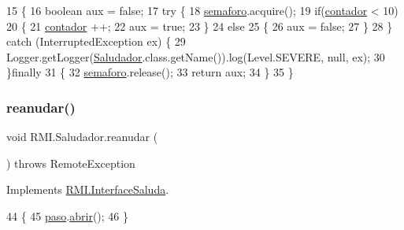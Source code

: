 \begin{DoxyCode}
15     \{
16         \textcolor{keywordtype}{boolean} aux = \textcolor{keyword}{false};
17         \textcolor{keywordflow}{try} \{
18             \mbox{\hyperlink{class_r_m_i_1_1_saludador_a772baa4676a1aa111b792ebd3d77cfcd}{semaforo}}.acquire();
19             \textcolor{keywordflow}{if}(\mbox{\hyperlink{class_r_m_i_1_1_saludador_aee589ef80147254fc33e2b73d5f8ca2b}{contador}} < 10)
20             \{
21                 \mbox{\hyperlink{class_r_m_i_1_1_saludador_aee589ef80147254fc33e2b73d5f8ca2b}{contador}} ++;
22                 aux = \textcolor{keyword}{true};
23             \}
24             \textcolor{keywordflow}{else}
25             \{
26                 aux = \textcolor{keyword}{false};
27             \}
28         \} \textcolor{keywordflow}{catch} (InterruptedException ex) \{
29             Logger.getLogger(\mbox{\hyperlink{class_r_m_i_1_1_saludador_a142d4fff5a3506d069b4a80a9e571de0}{Saludador}}.class.getName()).log(Level.SEVERE, null, ex);
30         \}\textcolor{keywordflow}{finally}
31         \{
32             \mbox{\hyperlink{class_r_m_i_1_1_saludador_a772baa4676a1aa111b792ebd3d77cfcd}{semaforo}}.release();
33             \textcolor{keywordflow}{return} aux;
34         \}
35     \}
\end{DoxyCode}
\mbox{\label{class_r_m_i_1_1_saludador_af163fac056a4927e199c43262d3f3b05}} 
\subsubsection{\texorpdfstring{reanudar()}{reanudar()}}
{\footnotesize\ttfamily void R\+M\+I.\+Saludador.\+reanudar (\begin{DoxyParamCaption}{ }\end{DoxyParamCaption}) throws Remote\+Exception\hspace{0.3cm}{\ttfamily [inline]}}



Implements \mbox{\hyperlink{interface_r_m_i_1_1_interface_saluda_a8d97c9155ed6c35d8691263d1b70000a}{R\+M\+I.\+Interface\+Saluda}}.


\begin{DoxyCode}
44     \{   
45         \mbox{\hyperlink{class_r_m_i_1_1_saludador_acf8f2452f97fd371135558ba37283fa4}{paso}}.\mbox{\hyperlink{class_r_m_i_1_1_paso_a812e38e5e102e7da3fbd1ba669baa213}{abrir}}();
46     \}
\end{DoxyCode}
\mbox{\label{class_r_m_i_1_1_saludador_af05a48b9f5aaacd7c3cefcf12e9c1969}} 

